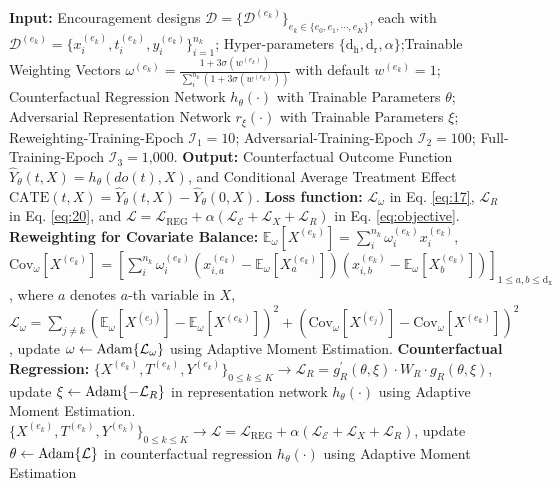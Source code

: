 \documentclass[journal]{IEEEtran}
\begin{document}
\begin{algorithm*}[t]
    \caption{EnCounteR: Encouragement-Based Counterfactual Regression}
    \label{algorithm}
    \begin{algorithmic}
	\STATE \textbf{Input:} Encouragement designs $\mathcal{D} = \{ \mathcal{D}^{(e_k)} \}_{e_k \in \{e_0,e_1,\cdots,e_K\}}$, each with $\mathcal{D}^{(e_k)} = \{x_i^{(e_k)}, t_i^{(e_k)}, y_i^{(e_k)} \}_{i=1}^{n_k}$; Hyper-parameters $\{\text{d}_\text{h},\text{d}_\text{r},\alpha\}$;Trainable Weighting Vectors $\omega^{(e_k)} = \frac{1+3\sigma(w^{(e_k)})} {\sum_i^{n_k}(1+3\sigma(w^{(e_k)}))}$ with default $w^{(e_k)}=1$; Counterfactual Regression Network $h_\theta(\cdot)$ with Trainable Parameters $\theta$; Adversarial Representation Network $r_\xi(\cdot)$ with Trainable Parameters $\xi$; Reweighting-Training-Epoch $\mathcal{I}_1=\text{10}$; Adversarial-Training-Epoch $\mathcal{I}_2=\text{100}$; Full-Training-Epoch $\mathcal{I}_3=\text{1,000}$. 
        \STATE \textbf{Output:} Counterfactual Outcome Function $\hat{Y}_\theta(t, X)=h_{\theta}(do(t), X)$, and Conditional Average Treatment Effect $\text{CATE}(t, X)=\hat{Y}_\theta(t, X)-\hat{Y}_\theta(0, X)$. 
	\STATE \textbf{Loss function:} $\mathcal{L}_\omega$ in Eq. \eqref{eq:17}, $\mathcal{L}_R$ in Eq. \eqref{eq:20},  and $\mathcal{L}=\mathcal{L}_{\text{REG}} + \alpha (\mathcal{L}_{\mathcal{E}} + \mathcal{L}_{X} + \mathcal{L}_{R})$ in Eq. \eqref{eq:objective}.
	\STATE \textbf{Reweighting for Covariate Balance:}
        \STATE $\mathbb{E}_{\omega}[X^{(e_k)}] = \sum_i^{n_k}\omega_i^{(e_k)} x_i^{(e_k)}$, 
        \STATE $\text{Cov}_{\omega}[X^{(e_k)}] = \left[\sum_i^{n_k}\omega_i^{(e_k)}(x_{i,a}^{(e_k)}-\mathbb{E}_{\omega}[X^{(e_k)}_a])(x_{i,b}^{(e_k)}-\mathbb{E}_{\omega}[X^{(e_k)}_b])\right]_{1 \leq a,b \leq \text{d}_\text{x}}$, where $a$ denotes $a$-th variable in $X$, 
	\STATE $\mathcal{L}_{\omega} = \sum_{j \not = k}
        (\mathbb{E}_{\omega}[X^{(e_j)}] - \mathbb{E}_{\omega}[X^{(e_k)}])^2 
        + 
        (\text{Cov}_{\omega}[X^{(e_j)}] - \text{Cov}_{\omega}[X^{(e_k)}])^2$,
	\STATE update $\omega \leftarrow {\rm{Adam}}\{\mathcal{L}_{\omega}\}$ using Adaptive Moment Estimation.
	\ENDFOR
	\STATE \textbf{Counterfactual Regression:}
        \STATE $ \{X^{(e_k)}, T^{(e_k)}, Y^{(e_k)} \}_{0 \leq k \leq K} \rightarrow 
        \mathcal{L}_{R} =  g_R^\prime\left(\theta, \xi\right) \cdot W_R \cdot g_R\left(\theta, \xi\right)$,
        \STATE update $\xi \leftarrow {\rm{Adam}}\{-\mathcal{L}_R\}$ in representation network $h_\theta(\cdot)$ using Adaptive Moment Estimation.
        \ENDIF
	\STATE $ \{X^{(e_k)}, T^{(e_k)}, Y^{(e_k)} \}_{0 \leq k \leq K} \rightarrow 
        \mathcal{L}=\mathcal{L}_{\text{REG}} + \alpha (\mathcal{L}_{\mathcal{E}} + \mathcal{L}_{X} + \mathcal{L}_{R})$,
        \STATE update $\theta \leftarrow {\rm{Adam}}\{\mathcal{L}\}$ in counterfactual regression $h_\theta(\cdot)$ using Adaptive Moment Estimation
	\ENDFOR
\end{algorithmic}
\end{algorithm*}
\end{document}
